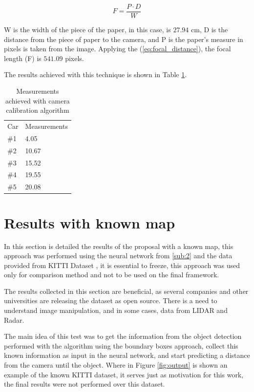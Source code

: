 \begin{equation}
    \label{eq:focal_distance}
    F = \frac{P\cdot D}{W}
\end{equation}

W is the width of the piece of the paper, in this case, is $27.94$ cm, D is the distance from the piece of paper to the camera, and P is the paper's measure in pixels is taken from the image. Applying the (\ref{eq:focal_distance}), the focal length (F) is $541.09$ pixels.





The results achieved with this technique is shown in Table \ref{tab:output_calibrate}. 

\begin{table}[H]
\centering
\caption{Measurements achieved with camera calibration algorithm}
\begin{tabular}{l|l} 
\toprule
Car &  Measurements      \\
\#1   & 4.05        \\
\#2   & 10.67       \\
\#3   & 15.52       \\
\#4   & 19.55       \\
\#5   & 20.08       \\
\bottomrule
\end{tabular}
\label{tab:output_calibrate}
\end{table} 



\section{Results with known map}
In this section is detailed the results of the proposal with a known map, this approach was performed using the neural network from \ref{sub:2} and the data provided from KITTI Dataset \cite{geiger2013vision}, it is essential to freeze, this approach was used only for comparison method and not to be used on the final framework. 


The results collected in this section are beneficial, as several companies and other universities are releasing the dataset as open source. There is a need to understand image manipulation, and in some cases, data from LIDAR and Radar.

The main idea of this test was to get the information from the object detection performed with the algorithm using the boundary boxes approach, collect this known information as input in the neural network, and start predicting a distance from the camera until the object. Where in Figure \ref{fig:output} is shown an example of the known KITTI dataset, it serves just as motivation for this work, the final results were not performed over this dataset. 

